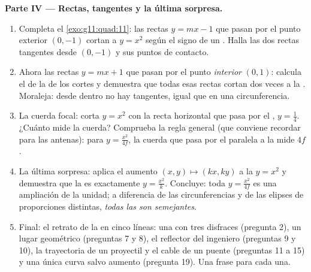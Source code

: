 \begin{problem}
\medskip
\noindent\textbf{Parte IV --- Rectas, tangentes y la última
sorpresa.}
\begin{enumerate}[resume]
  \item Completa el \cref{exo:g11:quad:11}: las rectas $y = mx - 1$ que
        pasan por el punto exterior $(0, -1)$ cortan a $y = x^2$ según el
        signo de un . Halla las dos rectas tangentes desde
        $(0, -1)$ y sus puntos de contacto.
  \item Ahora las rectas $y = mx + 1$ que pasan por el punto
        \emph{interior} $(0, 1)$: calcula el  de la 
        de los cortes y demuestra que todas esas rectas cortan dos veces a
        la . Moraleja: desde dentro no hay tangentes, igual que en
        una circunferencia.
  \item La cuerda focal: corta $y = x^2$ con la recta horizontal que pasa
        por el , $y = \frac14$. ¿Cuánto mide la cuerda? Comprueba la
        regla general (que conviene recordar para las antenas): para
        $y = \frac{x^2}{4f}$, la cuerda que pasa por el  paralela a la
         mide $4f$.
  \item La última sorpresa: aplica el aumento
        $(x, y) \mapsto (kx, ky)$ a la  $y = x^2$ y demuestra que
        la  es exactamente $y = \frac{x^2}{k}$. Concluye: toda
         $y = \frac{x^2}{4f}$ es una ampliación de la 
        unidad; a diferencia de las circunferencias y de las elipses de
        proporciones distintas, \emph{todas las  son
        semejantes}.
  \item Final: el retrato de la  en cinco líneas: una  con
        tres disfraces (pregunta 2), un lugar geométrico (preguntas 7 y
        8), el reflector del ingeniero (preguntas 9 y 10), la trayectoria
        de un proyectil y el cable de un puente (preguntas 11 a 15) y una
        única curva salvo aumento (pregunta 19). Una frase para cada una.
\end{enumerate}
\end{problem}
